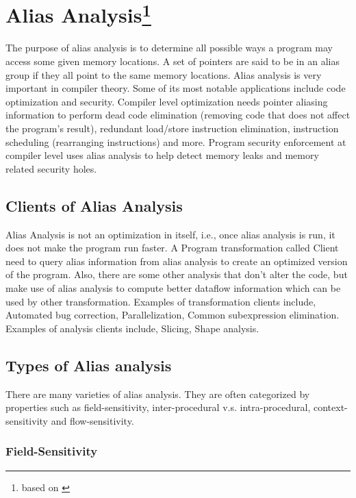 \newpage

\section{Alias Analysis\footnote{based on \cite{ShengHsi98:online}}}

The purpose of alias analysis is to determine all possible ways a program may access some given
memory locations. A set of pointers are said to be in an alias group if they all point to the same
memory locations.  Alias analysis is very important in compiler theory. Some of its most notable applications
include code optimization and security. Compiler level optimization needs pointer aliasing information to perform dead code elimination (removing code that does not affect the program’s
result), redundant load/store instruction elimination, instruction scheduling (rearranging instructions) and more. Program security enforcement at compiler level uses alias analysis to help detect
memory leaks and memory related security holes.


\subsection{Clients of Alias Analysis}

Alias Analysis is not an optimization in itself, i.e., once alias analysis is run, it does not make the
program run faster. A Program transformation called Client need to query alias information from
alias analysis to create an optimized version of the program. Also, there are some other analysis
that don’t alter the code, but make use of alias analysis to compute better dataflow information
which can be used by other transformation. Examples of transformation clients include, Automated
bug correction, Parallelization, Common subexpression elimination. Examples of analysis clients
include, Slicing, Shape analysis.

\subsection{Types of Alias analysis}

There are many varieties of alias analysis. They are often categorized by properties such as
field-sensitivity, inter-procedural v.s. intra-procedural, context-sensitivity and flow-sensitivity.


\subsubsection{Field-Sensitivity}


